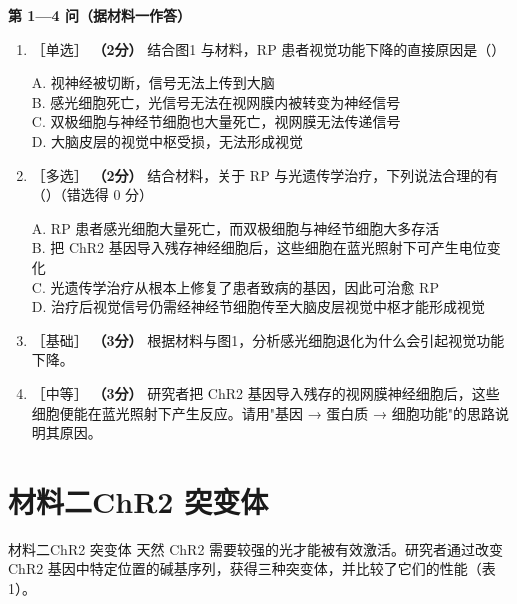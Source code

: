 \documentclass[UTF8,a4paper,11pt]{ctexart}
\newcommand{\pt}[1]{\textbf{（#1分）}}
\newcommand{\lv}[1]{{\small\color{deepgreen}［#1］}}
\newcommand{\choice}[1]{\par\smallskip\noindent #1\par}
\begin{document}
\begin{qbox}
\noindent\textbf{\color{deepgreen}第 1—4 问（据材料一作答）}
\begin{enumerate}[leftmargin=2.2em,itemsep=5pt]
\item \lv{单选} \pt{2} 结合图1 与材料，RP 患者视觉功能下降的直接原因是（\quad）\\
\choice{A. 视神经被切断，信号无法上传到大脑\\
B. 感光细胞死亡，光信号无法在视网膜内被转变为神经信号\\
C. 双极细胞与神经节细胞也大量死亡，视网膜无法传递信号\\
D. 大脑皮层的视觉中枢受损，无法形成视觉}

\item \lv{多选} \pt{2} 结合材料，关于 RP 与光遗传学治疗，下列说法合理的有（\quad）（错选得 0 分）\\
\choice{A. RP 患者感光细胞大量死亡，而双极细胞与神经节细胞大多存活\\
B. 把 ChR2 基因导入残存神经细胞后，这些细胞在蓝光照射下可产生电位变化\\
C. 光遗传学治疗从根本上修复了患者致病的基因，因此可治愈 RP\\
D. 治疗后视觉信号仍需经神经节细胞传至大脑皮层视觉中枢才能形成视觉}

\item \lv{基础} \pt{3} 根据材料与图1，分析感光细胞退化为什么会引起视觉功能下降。

\item \lv{中等} \pt{3} 研究者把 ChR2 基因导入残存的视网膜神经细胞后，这些细胞便能在蓝光照射下产生反应。请用"基因 → 蛋白质 → 细胞功能"的思路说明其原因。
\end{enumerate}
\end{qbox}

\section{材料二\quad ChR2 突变体}

\begin{matbox}{材料二\quad ChR2 突变体}
天然 ChR2 需要较强的光才能被有效激活。研究者通过改变 ChR2 基因中特定位置的碱基序列，获得三种突变体，并比较了它们的性能（表1）。
\end{matbox}
\end{document}
